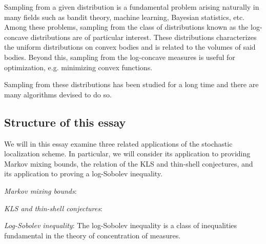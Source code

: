 Sampling from a given distribution is a fundamental problem arising naturally in many fields 
such as bandit theory, machine learning, Bayesian statistics, etc. Among these problems, sampling from the class of 
distributions known as the log-concave distributions are of particular interest.
These distributions characterizes the uniform distributions on convex bodies and is related to the volumes
of said bodies. Beyond this, sampling from the log-concave measures is useful for optimization, e.g. 
minimizing convex functions. 

Sampling from these distributions has been studied for a long time and there are many algorithms 
devised to do so. 





\subsection{Structure of this essay}

We will in this essay examine three related applications of the stochastic localization scheme. In particular,
we will consider its application to providing Markov mixing bounds, the relation of the KLS and thin-shell 
conjectures, and its application to proving a log-Sobolev inequality. 

\textit{Markov mixing bounds}: 

\textit{KLS and thin-shell conjectures}:

\textit{Log-Sobolev inequality}: The log-Sobolev inequality is a class of inequalities fundamental in the 
theory of concentration of measures. 